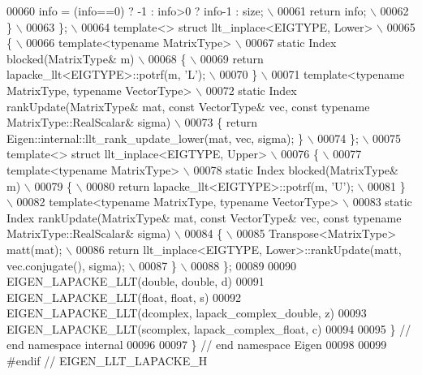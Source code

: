 \begin{DoxyCode}
00060 \textcolor{preprocessor}{    info = (info==0) ? -1 : info>0 ? info-1 : size; \(\backslash\)}
00061 \textcolor{preprocessor}{    return info; \(\backslash\)}
00062 \textcolor{preprocessor}{  \} \(\backslash\)}
00063 \textcolor{preprocessor}{\}; \(\backslash\)}
00064 \textcolor{preprocessor}{template<> struct llt\_inplace<EIGTYPE, Lower> \(\backslash\)}
00065 \textcolor{preprocessor}{\{ \(\backslash\)}
00066 \textcolor{preprocessor}{  template<typename MatrixType> \(\backslash\)}
00067 \textcolor{preprocessor}{  static Index blocked(MatrixType& m) \(\backslash\)}
00068 \textcolor{preprocessor}{  \{ \(\backslash\)}
00069 \textcolor{preprocessor}{    return lapacke\_llt<EIGTYPE>::potrf(m, 'L'); \(\backslash\)}
00070 \textcolor{preprocessor}{  \} \(\backslash\)}
00071 \textcolor{preprocessor}{  template<typename MatrixType, typename VectorType> \(\backslash\)}
00072 \textcolor{preprocessor}{  static Index rankUpdate(MatrixType& mat, const VectorType& vec, const typename MatrixType::RealScalar&
       sigma) \(\backslash\)}
00073 \textcolor{preprocessor}{  \{ return Eigen::internal::llt\_rank\_update\_lower(mat, vec, sigma); \} \(\backslash\)}
00074 \textcolor{preprocessor}{\}; \(\backslash\)}
00075 \textcolor{preprocessor}{template<> struct llt\_inplace<EIGTYPE, Upper> \(\backslash\)}
00076 \textcolor{preprocessor}{\{ \(\backslash\)}
00077 \textcolor{preprocessor}{  template<typename MatrixType> \(\backslash\)}
00078 \textcolor{preprocessor}{  static Index blocked(MatrixType& m) \(\backslash\)}
00079 \textcolor{preprocessor}{  \{ \(\backslash\)}
00080 \textcolor{preprocessor}{    return lapacke\_llt<EIGTYPE>::potrf(m, 'U'); \(\backslash\)}
00081 \textcolor{preprocessor}{  \} \(\backslash\)}
00082 \textcolor{preprocessor}{  template<typename MatrixType, typename VectorType> \(\backslash\)}
00083 \textcolor{preprocessor}{  static Index rankUpdate(MatrixType& mat, const VectorType& vec, const typename MatrixType::RealScalar&
       sigma) \(\backslash\)}
00084 \textcolor{preprocessor}{  \{ \(\backslash\)}
00085 \textcolor{preprocessor}{    Transpose<MatrixType> matt(mat); \(\backslash\)}
00086 \textcolor{preprocessor}{    return llt\_inplace<EIGTYPE, Lower>::rankUpdate(matt, vec.conjugate(), sigma); \(\backslash\)}
00087 \textcolor{preprocessor}{  \} \(\backslash\)}
00088 \textcolor{preprocessor}{\};}
00089 
00090 EIGEN\_LAPACKE\_LLT(\textcolor{keywordtype}{double}, \textcolor{keywordtype}{double}, d)
00091 EIGEN\_LAPACKE\_LLT(\textcolor{keywordtype}{float}, \textcolor{keywordtype}{float}, s)
00092 EIGEN\_LAPACKE\_LLT(dcomplex, lapack\_complex\_double, z)
00093 EIGEN\_LAPACKE\_LLT(scomplex, lapack\_complex\_float, c)
00094 
00095 \} \textcolor{comment}{// end namespace internal}
00096 
00097 \} \textcolor{comment}{// end namespace Eigen}
00098 
00099 \textcolor{preprocessor}{#endif // EIGEN\_LLT\_LAPACKE\_H}
\end{DoxyCode}
